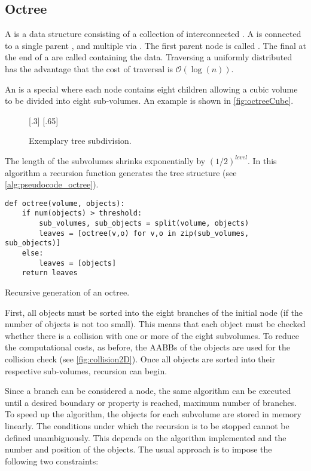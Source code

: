 \subsection{Octree}\label{sec:octree}
%
A  is a data structure consisting of a collection of interconnected  .
A  is connected to a single parent , and multiple  via .
The first parent node is called .
The final  at the end of a  are called  containing the data.
Traversing a uniformly distributed  has the advantage that the cost of traversal is $\mathcal{O}(\log(n))$.
\par
%
An  is a special  where each node contains eight children allowing a cubic volume to be divided into eight sub-volumes.
An example is shown in \cref{fig:octreeCube}.
%
\begin{figure}[!t]
    \centering
    [.3\textwidth]{
    \def\tikzheight{0.6\textwidth}
    }
    \hfill
    [.65\textwidth]{
    \def\tikzheight{0.6\textwidth}
    }
	\caption[]{Exemplary tree subdivision.}
	\label{fig:octree}
\end{figure}
%
The length of the subvolumes shrinks exponentially by $(1/2)^\mathit{level}$.
In this algorithm a recursion function  generates the tree structure (see \cref{alg:pseudocode_octree}).
\par
%
\begin{lstfloat}[!tb]
\lstset{style=python}
\begin{lstlisting}[]
def octree(volume, objects):
    if num(objects) > threshold:
        sub_volumes, sub_objects = split(volume, objects)
        leaves = [octree(v,o) for v,o in zip(sub_volumes, sub_objects)]
    else:
        leaves = [objects]
    return leaves
\end{lstlisting}
\caption[]{Recursive generation of an octree.}
\label{alg:pseudocode_octree}
\end{lstfloat}
%
First, all objects must be sorted into the eight branches of the initial node (if the number of objects is not too small). This means that each object must be checked whether there is a collision with one or more of the eight subvolumes.
To reduce the computational costs, as before, the \acp{AABB} of the objects are used for the collision check (see \cref{fig:collision2D}).
Once all objects are sorted into their respective sub-volumes, recursion can begin.
\par
%
Since a branch can be considered a node, the same algorithm can be executed until a desired boundary or property is reached, \eg{} maximum number of branches.
To speed up the algorithm, the objects for each subvolume are stored in memory linearly.
The conditions under which the recursion is to be stopped cannot be defined unambiguously.
This depends on the algorithm implemented and the number and position of the objects.
The usual approach is to impose the following two constraints:
%

